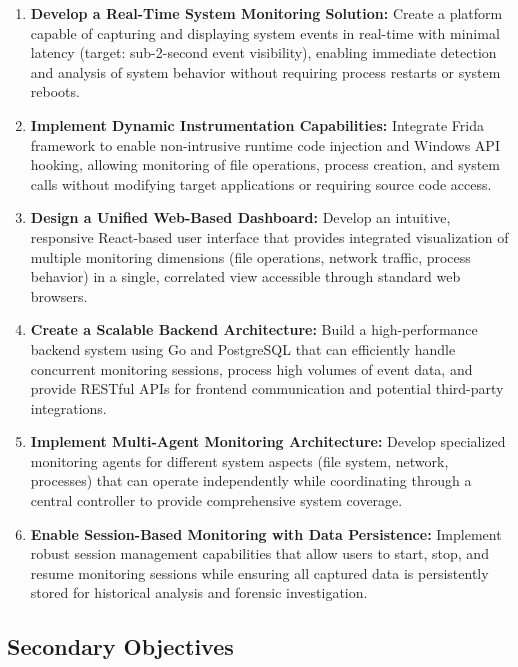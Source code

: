 \begin{enumerate}
    \item \textbf{Develop a Real-Time System Monitoring Solution:} Create a platform capable of capturing and displaying system events in real-time with minimal latency (target: sub-2-second event visibility), enabling immediate detection and analysis of system behavior without requiring process restarts or system reboots.
    
    \item \textbf{Implement Dynamic Instrumentation Capabilities:} Integrate Frida framework to enable non-intrusive runtime code injection and Windows API hooking, allowing monitoring of file operations, process creation, and system calls without modifying target applications or requiring source code access.
    
    \item \textbf{Design a Unified Web-Based Dashboard:} Develop an intuitive, responsive React-based user interface that provides integrated visualization of multiple monitoring dimensions (file operations, network traffic, process behavior) in a single, correlated view accessible through standard web browsers.
    
    \item \textbf{Create a Scalable Backend Architecture:} Build a high-performance backend system using Go and PostgreSQL that can efficiently handle concurrent monitoring sessions, process high volumes of event data, and provide RESTful APIs for frontend communication and potential third-party integrations.
    
    \item \textbf{Implement Multi-Agent Monitoring Architecture:} Develop specialized monitoring agents for different system aspects (file system, network, processes) that can operate independently while coordinating through a central controller to provide comprehensive system coverage.
    
    \item \textbf{Enable Session-Based Monitoring with Data Persistence:} Implement robust session management capabilities that allow users to start, stop, and resume monitoring sessions while ensuring all captured data is persistently stored for historical analysis and forensic investigation.
\end{enumerate}

\subsection*{Secondary Objectives}


